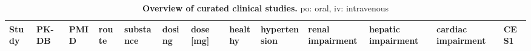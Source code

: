 \begin{table}[htbp]
\centering
\caption[Curated clinical studies]{\textbf{Overview of curated clinical studies.} po: oral, iv: intravenous}
\vspace{0.1cm}
{\fontsize{7}{9}\selectfont
\setlength{\tabcolsep}{1.5pt}
\begin{tabular}{L{0.104\textwidth} L{0.091\textwidth} L{0.075\textwidth} L{0.035\textwidth} L{0.065\textwidth} L{0.070\textwidth} L{0.040\textwidth} L{0.068\textwidth} L{0.068\textwidth} L{0.068\textwidth} L{0.068\textwidth} L{0.068\textwidth} L{0.072\textwidth}}
\textbf{Study} & \textbf{PK-DB} & \textbf{PMID} & \textbf{route} & \textbf{substance} & \textbf{dosing} & \textbf{dose [mg]} & \textbf{healthy} & \textbf{hyper\-tension} & \textbf{renal impairment} & \textbf{hepatic impairment} & \textbf{cardiac impairment} & \textbf{CES1} \\

\hline


\end{tabular}}
\end{table}

